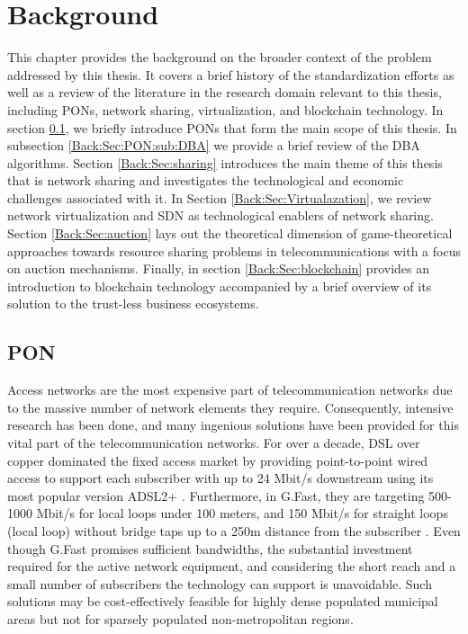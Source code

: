 \chapter*{Background}

This chapter provides the background on the broader context of the problem addressed by this thesis. It covers a brief history of the standardization efforts as well as a review of the literature in the research domain relevant to this thesis, including \acp{PON}, network sharing, virtualization, and blockchain technology. In section \ref{Back:Sec:PON}, we briefly introduce \acp{PON} that form the main scope of this thesis. In subsection \ref{Back:Sec:PON:sub:DBA} we provide a brief review of the \ac{DBA} algorithms. Section \ref{Back:Sec:sharing} introduces the main theme of this thesis that is network sharing and investigates the technological and economic challenges associated with it. In Section \ref{Back:Sec:Virtualazation}, we review network virtualization and \ac{SDN} as technological enablers of network sharing. Section \ref{Back:Sec:auction} lays out the theoretical dimension of game-theoretical approaches towards resource sharing problems in telecommunications with a focus on auction mechanisms. Finally, in section \ref{Back:Sec:blockchain} provides an introduction to blockchain technology accompanied by a brief overview of its solution to the trust-less business ecosystems.


\section{\acf{PON}}
\label{Back:Sec:PON}

Access networks are the most expensive part of telecommunication networks due to the massive number of network elements they require. Consequently, intensive research has been done, and many ingenious solutions have been provided for this vital part of the telecommunication networks. For over a decade, \ac{DSL} over copper dominated the fixed access market by providing point-to-point wired access to support each subscriber with up to 24 Mbit/s downstream using its most popular version ADSL2+ \cite{ituG.992.5}. Furthermore, in \ac{G.Fast}, they are targeting 500-1000 Mbit/s for local loops under 100 meters, and 150 Mbit/s for straight loops (local loop) without bridge taps up to a 250m distance from the subscriber \cite{ituG.9700}. Even though \ac{G.Fast} promises sufficient bandwidths, the substantial investment required for the active network equipment, and considering the short reach and a small number of subscribers the technology can support is unavoidable. Such solutions may be cost-effectively feasible for highly dense populated municipal areas but not for sparsely populated non-metropolitan regions.

